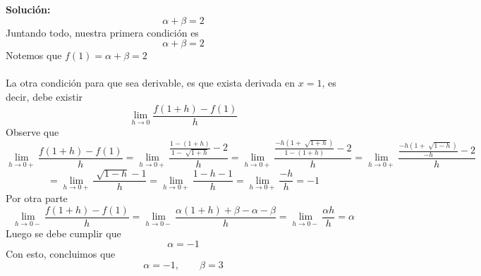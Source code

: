 \documentclass[12pt]{article}
\newenvironment{solucion}
{\begin{mdframed}[backgroundcolor=black!10]
		{\bf Solución:}\\
	}
	{
	\end{mdframed}
}
\newenvironment{preguntas}
{\begin{enumerate}\itemsep12pt
	}
	{
	\end{enumerate}
}
\newcommand{\ra}{\rightarrow}
\begin{document}
\begin{preguntas}
\begin{solucion}
$$\alpha + \beta = 2$$
Juntando todo, nuestra primera condición es
$$\alpha + \beta = 2$$
Notemos que $f(1) = \alpha + \beta = 2$\\
\\
La otra condición para que sea derivable, es que exista derivada en $x=1$, es decir, debe existir
$$\lim\limits_{h\ra 0} \dfrac{f(1+h) - f(1)}{h}$$
Observe que
\small$$\lim\limits_{h\ra 0+} \dfrac{f(1+h) - f(1)}{h} = 
\lim\limits_{h\ra 0+} \dfrac{\frac{1-(1+h)}{1-\sqrt[]{1+h}}- 2}{h} = 
\lim\limits_{h\ra 0+} \dfrac{\frac{-h(1+\sqrt[]{1+h})}{1-(1+h)}- 2}{h} = 
\lim\limits_{h\ra 0+} \dfrac{\frac{-h(1+\sqrt[]{1-h})}{-h}- 2}{h}  $$
$$= 
\lim\limits_{h\ra 0+} \dfrac{\sqrt[]{1-h} - 1}{h} = 
\lim\limits_{h\ra 0+} \dfrac{1-h - 1}{h} = 
\lim\limits_{h\ra 0+} \dfrac{-h}{h} =
-1$$
Por otra parte
$$\lim\limits_{h\ra 0-} \dfrac{f(1+h) - f(1)}{h} = 
\lim\limits_{h\ra 0-} \dfrac{\alpha(1+h) +\beta - \alpha - \beta}{h} = 
\lim\limits_{h\ra 0-} \dfrac{\alpha h }{h} =
\alpha
$$
Luego se debe cumplir que
$$\alpha = -1$$
Con esto, concluimos que
$$\alpha = -1, \qquad \beta = 3$$
\end{solucion}
\end{preguntas}
\end{document}
